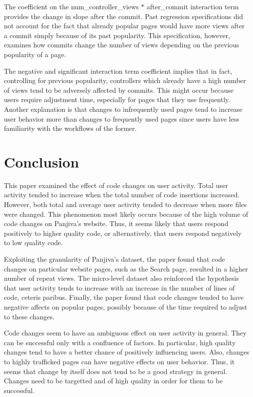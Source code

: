 \documentclass[10pt]{article}
\begin{document}
The coefficient on the num\_controller\_views $*$ after\_commit interaction term provides the change in slope after the commit. Past regression specifications did not account for the fact that already popular pages would have more views after a commit simply because of its past popularity. This specification, however, examines how commits change the number of views depending on the previous popularity of a page.

The negative and significant interaction term coefficient implies that in fact, controlling for previous popularity, controllers which already have a high number of views tend to be adversely affected by commits. This might occur because users require adjustment time, especially for pages that they use frequently. Another explanation is that changes to infrequently used pages tend to increase user behavior more than changes to frequently used pages since users have less familiarity with the workflows of the former.

\section{Conclusion}

This paper examined the effect of code changes on user activity. Total user activity tended to increase when the total number of code insertions increased. However, both total and average user activity tended to decrease when more files were changed. This phenomenon most likely occurs because of the high volume of code changes on Panjiva's website. Thus, it seems likely that users respond positively to higher quality code, or alternatively, that users respond negatively to low quality code. 

Exploiting the granularity of Panjiva's dataset, the paper found that code changes on particular website pages, such as the Search page, resulted in a higher number of repeat views. The micro-level dataset also reinforced the hypothesis that user activity tends to increase with an increase in the number of lines of code, ceteris paribus. Finally, the paper found that code changes tended to have negative affects on popular pages, possibly because of the time required to adjust to these changes.

Code changes seem to have an ambiguous effect on user activity in general. They can be successful only with a confluence of factors. In particular, high quality changes tend to have a better chance of positively influencing users. Also, changes to highly trafficked pages can have negative effects on user behavior. Thus, it seems that change by itself does not tend to be a good strategy in general. Changes need to be targetted and of high quality in order for them to be successful. 
\end{document}
